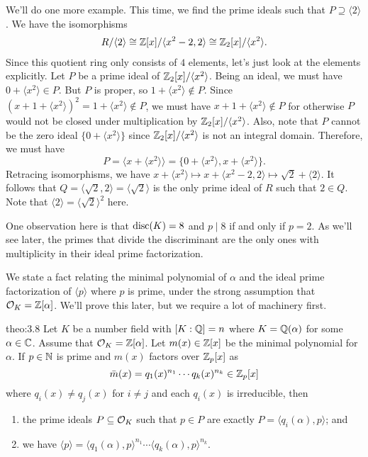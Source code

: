 We'll do one more example. This time, we find the prime ideals such 
that $P \supseteq \langle 2 \rangle$. We have the isomorphisms 
\begin{align*}
    R/\langle 2 \rangle \cong \mathbb{Z}[x]/\langle x^2-2, 2 \rangle 
    \cong \mathbb{Z}_2[x]/\langle x^2 \rangle.
\end{align*}
Since this quotient ring only consists of $4$ elements, let's just look 
at the elements explicitly. Let $P$ be a prime ideal of $\mathbb{Z}_2[x]/\langle x^2 \rangle$. 
Being an ideal, we must have $0 + \langle x^2 \rangle \in P$. But $P$ 
is proper, so $1 + \langle x^2 \rangle \notin P$. Since 
$(x+1 + \langle x^2 \rangle)^2 = 1 + \langle x^2 \rangle \notin P$,
we must have $x+1 + \langle x^2 \rangle \notin P$ for otherwise $P$ 
would not be closed under multiplication by $\mathbb{Z}_2[x]/\langle x^2 \rangle$.
Also, note that $P$ cannot be the zero ideal $\{0 + \langle x^2 \rangle\}$ since 
$\mathbb{Z}_2[x]/\langle x^2 \rangle$ is not an integral domain. Therefore, we must have 
\[ P = \langle x + \langle x^2 \rangle \rangle = \{0 + \langle x^2 \rangle, 
x + \langle x^2 \rangle\}. \] 
Retracing isomorphisms, we have 
$x + \langle x^2 \rangle \mapsto x + \langle x^2-2, 2 \rangle \mapsto 
\sqrt{2} + \langle 2 \rangle$.
It follows that $Q = \langle \sqrt{2}, 2 \rangle = \langle \sqrt{2} \rangle$ 
is the only prime ideal of $R$ such that $2 \in Q$. Note that 
$\langle 2 \rangle = \langle \sqrt{2} \rangle^2$ here.

One observation here is that $\operatorname{disc}(K) = 8$ and $p \mid 8$ if and only if 
$p = 2$. As we'll see later, the primes that divide the discriminant 
are the only ones with multiplicity in their ideal prime factorization. 

We state a fact relating the minimal polynomial of $\alpha$ and the 
ideal prime factorization of $\langle p \rangle$ where $p$ is prime, 
under the strong assumption that ${\cal O}_K = \mathbb{Z}[\alpha]$.  
We'll prove this later, but we require a lot of machinery first.

\begin{theo}{theo:3.8}
    Let $K$ be a number field with $[K : \mathbb{Q}] = n$ where $K = \mathbb{Q}(\alpha)$
    for some $\alpha \in \mathbb{C}$. 
    Assume that ${\cal O}_K = \mathbb{Z}[\alpha]$. Let $m(x) \in \mathbb{Z}[x]$ be the 
    minimal polynomial for $\alpha$. If $p \in \mathbb{N}$ is prime and $m(x)$ 
    factors over $\mathbb{Z}_p[x]$ as 
    \[ \bar{m}(x) = q_1(x)^{n_1} \cdots q_k(x)^{n_k} \in \mathbb{Z}_p[x] \] 
    where $q_i(x) \neq q_j(x)$ for $i \neq j$ and each $q_i(x)$ is irreducible, then 
    \begin{enumerate}[(1)]
        \item the prime ideals $P \subseteq {\cal O}_K$ such that $p \in P$ 
        are exactly $P = \langle q_i(\alpha), p \rangle$; and 
        \item we have $\langle p \rangle = \langle q_1(\alpha), p \rangle^{n_1}
        \cdots \langle q_k(\alpha), p \rangle^{n_k}$. 
    \end{enumerate} 
\end{theo}\vspace{-0.25cm}

